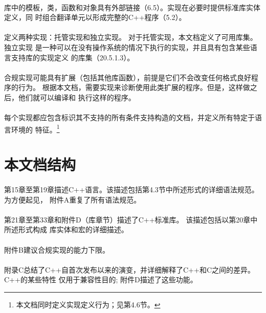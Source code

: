 \paragraph{}
库中的模板，类，函数和对象具有外部链接（6.5）。实现在必要时提供标准库实体定义，同
时组合翻译单元以形成完整的C++程序（5.2）。

\paragraph{}
定义两种实现：托管实现和独立实现。 对于托管实现，本文档定义了可用库集。 独立实现
是一种可以在没有操作系统的情况下执行的实现，并且具有包含某些语言支持库的实现定义
的库集（20.5.1.3）。

\paragraph{}
合规实现可能具有扩展（包括其他库函数），前提是它们不会改变任何格式良好程序的行为。
根据本文档，需要实现来诊断使用此类扩展的程序。但是，这样做之后，他们就可以编译和
执行这样的程序。

\paragraph{}
每个实现都应包含标识其不支持的所有条件支持构造的文档，并定义所有特定于语言环境的
特征。\footnote{本文档同时定义实现定义行为；见第4.6节。}

\section{本文档结构}
\paragraph{}
第15章至第19章描述C++语言。该描述包括第4.3节中所述形式的详细语法规范。为方便起见，
附件A重复了所有语法规范。

\paragraph{}
第21章至第33章和附件D（库章节）描述了C++标准库。 该描述包括以第20章中所述形式构成
库实体和宏的详细描述。 

\paragraph{}
附件B建议合规实现的能力下限。

\paragraph{}
附录C总结了C++自首次发布以来的演变，并详细解释了C++和C之间的差异。C++的某些特性
仅用于兼容性目的; 附件D描述了这些功能。

